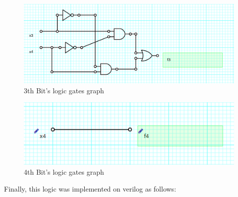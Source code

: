 \begin{figure}[!] %
\begin{centering}
\includegraphics[scale=0.25]{E4TP1/images/3}
\par\end{centering}
\caption{3th Bit's logic gates graph}
\end{figure}

\begin{figure}[!]%
\begin{centering}
\includegraphics[scale=0.25]{E4TP1/images/4}
\par\end{centering}
\caption{4th Bit's logic gates graph}
\end{figure}

Finally, this logic was implemented on verilog as follows:

